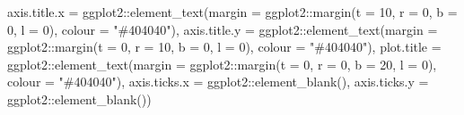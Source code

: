 \documentclass[
]{book}
\newenvironment{Shaded}{\begin{snugshade}}{\end{snugshade}}
\newcommand{\AttributeTok}[1]{\textcolor[rgb]{0.77,0.63,0.00}{#1}}
\newcommand{\DecValTok}[1]{\textcolor[rgb]{0.00,0.00,0.81}{#1}}
\newcommand{\FunctionTok}[1]{\textcolor[rgb]{0.00,0.00,0.00}{#1}}
\newcommand{\NormalTok}[1]{#1}
\newcommand{\SpecialCharTok}[1]{\textcolor[rgb]{0.00,0.00,0.00}{#1}}
\newcommand{\StringTok}[1]{\textcolor[rgb]{0.31,0.60,0.02}{#1}}
\begin{document}
\begin{Shaded}
\begin{Highlighting}[]
               \AttributeTok{axis.title.x =}\NormalTok{ ggplot2}\SpecialCharTok{::}\FunctionTok{element\_text}\NormalTok{(}\AttributeTok{margin =}\NormalTok{ ggplot2}\SpecialCharTok{::}\FunctionTok{margin}\NormalTok{(}\AttributeTok{t =} \DecValTok{10}\NormalTok{, }\AttributeTok{r =} \DecValTok{0}\NormalTok{, }\AttributeTok{b =} \DecValTok{0}\NormalTok{, }\AttributeTok{l =} \DecValTok{0}\NormalTok{), }\AttributeTok{colour =} \StringTok{"\#404040"}\NormalTok{),}
               \AttributeTok{axis.title.y =}\NormalTok{ ggplot2}\SpecialCharTok{::}\FunctionTok{element\_text}\NormalTok{(}\AttributeTok{margin =}\NormalTok{ ggplot2}\SpecialCharTok{::}\FunctionTok{margin}\NormalTok{(}\AttributeTok{t =} \DecValTok{0}\NormalTok{, }\AttributeTok{r =} \DecValTok{10}\NormalTok{, }\AttributeTok{b =} \DecValTok{0}\NormalTok{, }\AttributeTok{l =} \DecValTok{0}\NormalTok{), }\AttributeTok{colour =} \StringTok{"\#404040"}\NormalTok{),}
               \AttributeTok{plot.title =}\NormalTok{ ggplot2}\SpecialCharTok{::}\FunctionTok{element\_text}\NormalTok{(}\AttributeTok{margin =}\NormalTok{ ggplot2}\SpecialCharTok{::}\FunctionTok{margin}\NormalTok{(}\AttributeTok{t =} \DecValTok{0}\NormalTok{, }\AttributeTok{r =} \DecValTok{0}\NormalTok{, }\AttributeTok{b =} \DecValTok{20}\NormalTok{, }\AttributeTok{l =} \DecValTok{0}\NormalTok{), }\AttributeTok{colour =} \StringTok{"\#404040"}\NormalTok{),}
               \AttributeTok{axis.ticks.x =}\NormalTok{ ggplot2}\SpecialCharTok{::}\FunctionTok{element\_blank}\NormalTok{(),}
               \AttributeTok{axis.ticks.y =}\NormalTok{ ggplot2}\SpecialCharTok{::}\FunctionTok{element\_blank}\NormalTok{())}
\end{Highlighting}
\end{Shaded}
\end{document}
